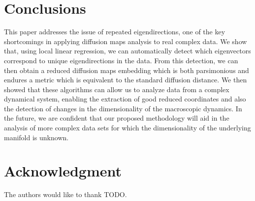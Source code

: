 \documentclass[3p]{elsarticle}
\begin{document}
\section{Conclusions}

This paper addresses the issue of repeated eigendirections, one of the key shortcomings in applying diffusion maps analysis to real complex data. 
%
We show that, using local linear regression, we can automatically detect which eigenvectors correspond to unique eigendirections in the data. 
%
From this detection, we can then obtain a reduced diffusion maps embedding which is both parsimonious and endures a metric which is equivalent to the standard diffusion distance. 
%
We then showed that these algorithms can allow us to analyze data from a complex dynamical system, enabling the extraction of good reduced coordinates and also the detection of changes in the dimensionality of the macroscopic dynamics. 
%
In the future, we are confident that our proposed methodology will aid in the analysis of more complex data sets for which the dimensionality of the underlying manifold is unknown. 

\section*{Acknowledgment}
The authors would like to thank TODO.



\end{document}
